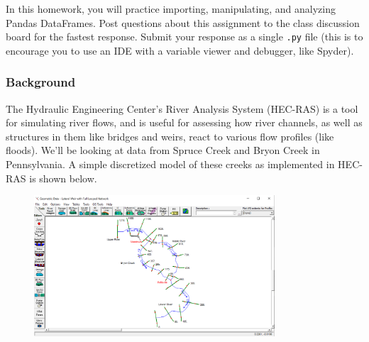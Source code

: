 \documentclass{homework}
\begin{document}
\maketitle

In this homework, you will practice importing, manipulating, and analyzing Pandas DataFrames. Post questions about this assignment to the class discussion board for the fastest response. Submit your response as a single \texttt{.py} file (this is to encourage you to use an IDE with a variable viewer and debugger, like Spyder).

\subsubsection*{Background}

The Hydraulic Engineering Center's River Analysis System (HEC-RAS) is a tool for simulating river flows, and is useful for assessing how river channels, as well as structures in them like bridges and weirs, react to various flow profiles (like floods). We'll be looking at data from Spruce Creek and Bryon Creek in Pennsylvania. A simple discretized model of these creeks as implemented in HEC-RAS is shown below.

\begin{figure}[h]
    \centering
    \includegraphics[width=0.8\textwidth]{hecras_geom.png}
\end{figure}
\end{document}
